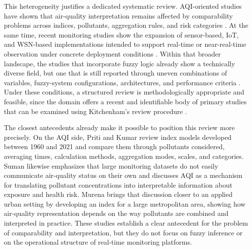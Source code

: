 This heterogeneity justifies a dedicated systematic review. AQI-oriented studies have shown that air-quality interpretation remains affected by comparability problems across indices, pollutants, aggregation rules, and risk categories \cite{ART01,ART02}. At the same time, recent monitoring studies show the expansion of sensor-based, IoT, and WSN-based implementations intended to support real-time or near-real-time observation under concrete deployment conditions \cite{PROB06,ART07,ART08}. Within that broader landscape, the studies that incorporate fuzzy logic already show a technically diverse field, but one that is still reported through uneven combinations of variables, fuzzy-system configurations, architectures, and performance criteria \cite{ART04,ART05,ART06,ART07,ART08}. Under these conditions, a structured review is methodologically appropriate and feasible, since the domain offers a recent and identifiable body of primary studies that can be examined using Kitchenham's review procedure \cite{kitchenham2007}.

The closest antecedents already make it possible to position this review more precisely. On the AQI side, Priti and Kumar \cite{ART01} review index models developed between 1960 and 2021 and compare them through pollutants considered, averaging times, calculation methods, aggregation modes, scales, and categories. Suman \cite{ART02} likewise emphasizes that large monitoring datasets do not easily communicate air-quality status on their own and discusses AQI as a mechanism for translating pollutant concentrations into interpretable information about exposure and health risk. Murena \cite{PROB08} brings that discussion closer to an applied urban setting by developing an index for a large metropolitan area, showing how air-quality representation depends on the way pollutants are combined and interpreted in practice. These studies establish a clear antecedent for the problem of comparability and interpretation, but they do not focus on fuzzy inference or on the operational structure of real-time monitoring platforms.

